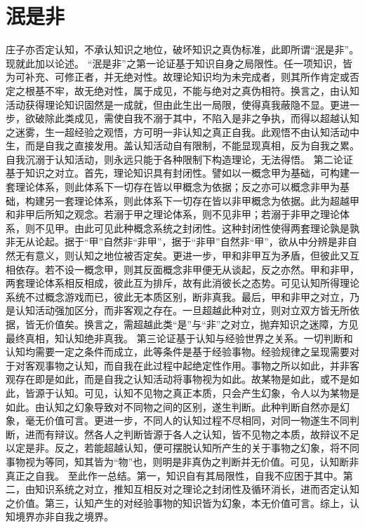 \documentclass[11pt]{article}
\begin{document}
\section{泯是非}
庄子亦否定认知，不承认知识之地位，破坏知识之真伪标准，此即所谓“泯是非”。现就此加以论述。
“泯是非”之第一论证基于知识自身之局限性。任一项知识，皆为可补充、可修正者，并无绝对性。故理论知识均为未完成者，则其所作肯定或否定之根基不牢，故无绝对性，属于成见，不能与绝对之真伪相符。换言之，由认知活动获得理论知识固然是一成就，但由此生出一局限，使得真我蔽隐不显。更进一步，欲破除此类成见，需使自我不溺于其中，不陷入是非之争执，而得以超越认知之迷雾，生一超经验之观悟，方可明一非认知之真正自我。此观悟不由认知活动中生，而是自我之直接发用。盖认知活动自有限制，不能显现真相，反为自我之累。自我沉溺于认知活动，则永远只能于各种限制下构造理论，无法得悟。
第二论证基于知识之对立。首先，理论知识具有封闭性。譬如以一概念甲为基础，可构建一套理论体系，则此体系下一切存在皆以甲概念为依据；反之亦可以概念非甲为基础，构建另一套理论体系，则此体系下一切存在皆以非甲概念为依据。此为超越甲和非甲后所知之观念。若溺于甲之理论体系，则不见非甲；若溺于非甲之理论体系，则不见甲。由此可见此种概念系统之封闭性。这种封闭性使得两套理论孰是孰非无从论起。据于“甲”自然非“非甲”，据于“非甲”自然非“甲”，欲从中分辨是非自然无有意义，则认知之地位被否定矣。更进一步，甲和非甲互为矛盾，但彼此又互相依存。若不设一概念甲，则其反面概念非甲便无从谈起，反之亦然。甲和非甲，两套理论体系相反相成，彼此互为排斥，故有此消彼长之态势。可见认知所得理论系统不过概念游戏而已，彼此无本质区别，断非真我。最后，甲和非甲之对立，乃是认知活动强加区分，而非客观之存在。一旦超越此种对立，则对立双方皆无所依据，皆无价值矣。换言之，需超越此类“是”与“非”之对立，抛弃知识之迷障，方见最终真相，知认知绝非真我。
第三论证基于认知与经验世界之关系。一切判断和认知均需要一定之条件而成立，此等条件是基于经验事物。经验规律之呈现需要对于对客观事物之认知，而自我在此过程中起绝定性作用。事物之所以如此，并非客观存在即是如此，而是自我之认知活动将事物视为如此。故某物是如此，或不是如此，皆源于认知。可见，认知不见物之真正本质，只会产生幻象，令人以为某物是如此。由认知之幻象导致对不同物之间的区别，遂生判断。此种判断自然亦是幻象，毫无价值可言。更进一步，不同人的认知过程不尽相同，对同一物遂生不同判断，进而有辩议。然各人之判断皆源于各人之认知，皆不见物之本质，故辩议不足以定是非。反之，若能超越认知，便可摆脱认知所产生的关于事物之幻象，将不同事物视为等同，知其皆为“物”也，则明是非真伪之判断并无价值。可见，认知断非真正之自我。
至此作一总结。第一，知识自有其局限性，自我不应困于其中。第二，由知识系统之对立，推知互相反对之理论之封闭性及循环消长，进而否定认知之价值。第三，认知产生的对经验事物的知识皆为幻象，本无价值可言。综上，认知境界亦非自我之境界。
\end{document}
